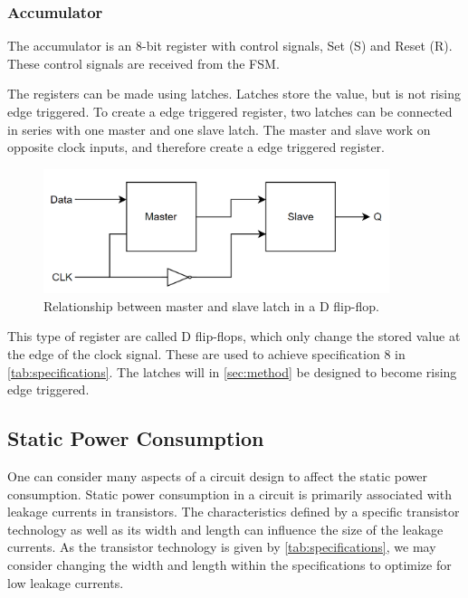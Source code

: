 \subsubsection{Accumulator}
The accumulator is an 8-bit register with control signals, Set (S) and Reset (R). These control signals are received from the FSM. 

The registers can be made using latches. Latches store the value, but is not rising edge triggered. To create a edge triggered register, two latches can be connected in series with one master and one slave latch. The master and slave work on opposite clock inputs, and therefore create a edge triggered register. 

\begin{figure}[H]
    \centering
    \includegraphics[width=0.9\textwidth]{Figures/DFF_Block.png}
    \caption{Relationship between master and slave latch in a D flip-flop.}
    \label{fig:enter-label}
\end{figure}

This type of register are called D flip-flops, which only change the stored value at the edge of the clock signal. These are used to achieve specification 8 in \autoref{tab:specifications}. The latches will in \autoref{sec:method} be designed to become rising edge triggered.

\subsection{Static Power Consumption}
\label{subsec:low_power}

One can consider many aspects of a circuit design to affect the static power consumption. Static power consumption in a circuit is primarily associated with leakage currents in transistors. The characteristics defined by a specific transistor technology as well as its width and length can influence the size of the leakage currents. As the transistor technology is given by \autoref{tab:specifications}, we may consider changing the width and length within the specifications to optimize for low leakage currents. 

